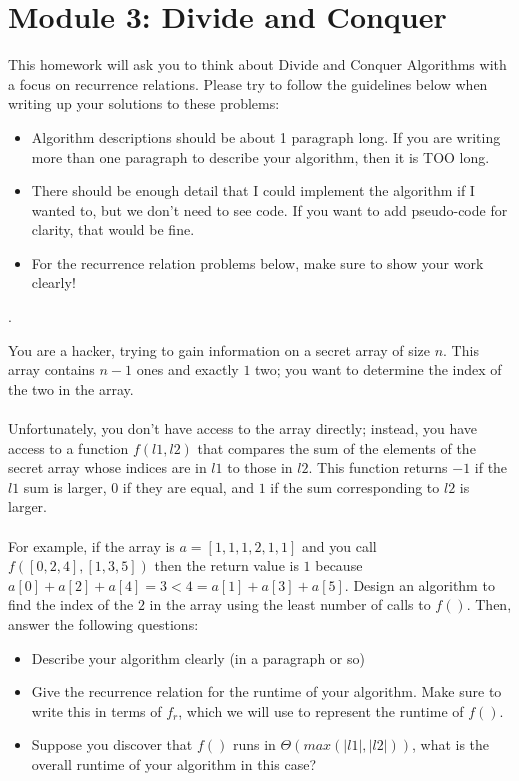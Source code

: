 \documentclass[12pt]{article}
\def\homework{Module 3: Divide and Conquer}
\newcounter{quesnum}
\newcommand{\question}[2][??]{
\begin{list}{\labelitemi}{\leftmargin=2em}
\item [\arabic{quesnum}.] {} {#2}
\end{list}
\addtocounter{quesnum}{1}
}
\begin{document}
\section*{\homework}

This homework will ask you to think about Divide and Conquer Algorithms with a focus on recurrence relations. Please try to follow the guidelines below when writing up your solutions to these problems:

\begin{itemize}
	\item Algorithm descriptions should be about 1 paragraph long. If you are writing more than one paragraph to describe your algorithm, then it is TOO long. 
	\item There should be enough detail that I could implement the algorithm if I wanted to, but we don't need to see code. If you want to add pseudo-code for clarity, that would be fine.
	\item For the recurrence relation problems below, make sure to show your work clearly!
\end{itemize}

\vspace{14pt}

\question[3]{
You are a hacker, trying to gain information on a secret array of size $n$. This array contains $n-1$ ones and exactly $1$ two; you want to determine the index of the two in the array.\\
\\
Unfortunately, you don't have access to the array directly; instead, you have access to a function $f(l1, l2)$ that compares the sum of the elements of the secret array whose indices are in $l1$ to those in $l2$. This function returns $-1$ if the $l1$ sum is larger, $0$ if they are equal, and $1$ if the sum corresponding to $l2$ is larger.\\
\\
For example, if the array is $a=[1,1,1,2,1,1]$ and you call $f([0,2,4],[1,3,5])$ then the return value is $1$ because $a[0]+a[2]+a[4]=3<4=a[1]+a[3]+a[5]$. Design an algorithm to find the index of the $2$ in the array using the least number of calls to $f()$. Then, answer the following questions:

\begin{itemize}
	\item Describe your algorithm clearly (in a paragraph or so)
	\item Give the recurrence relation for the runtime of your algorithm. Make sure to write this in terms of $f_r$, which we will use to represent the runtime of $f()$.
	\item Suppose you discover that $f()$ runs in $\Theta(max(|l1|,|l2|))$, what is the overall runtime of your algorithm in this case? 
\end{itemize}
}
\end{document}

